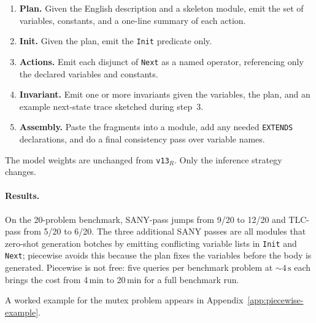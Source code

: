 \documentclass[11pt]{article}
\begin{document}
\begin{enumerate}[leftmargin=1.6em, itemsep=1pt]
\item \textbf{Plan.}  Given the English description and a skeleton
  module, emit the set of variables, constants, and a one-line
  summary of each action.
\item \textbf{Init.}  Given the plan, emit the \texttt{Init} predicate
  only.
\item \textbf{Actions.}  Emit each disjunct of \texttt{Next} as a
  named operator, referencing only the declared variables and
  constants.
\item \textbf{Invariant.}  Emit one or more invariants given the
  variables, the plan, and an example next-state trace
  sketched during step~3.
\item \textbf{Assembly.}  Paste the fragments into a module, add any
  needed \texttt{EXTENDS} declarations, and do a final
  consistency pass over variable names.
\end{enumerate}

The model weights are unchanged from \texttt{v13}$_R$.  Only the
inference strategy changes.

\paragraph{Results.}  On the 20-problem benchmark, SANY-pass jumps
from 9/20 to 12/20 and TLC-pass from 5/20 to 6/20.  The three
additional SANY passes are all modules that zero-shot generation
botches by emitting conflicting variable lists in \texttt{Init} and
\texttt{Next}; piecewise avoids this because the plan fixes the
variables before the body is generated.  Piecewise is not free:
five queries per benchmark problem at ${\sim}4\,\text{s}$ each brings
the cost from 4\,min to 20\,min for a full benchmark run.

A worked example for the mutex problem appears in
Appendix~\ref{app:piecewise-example}.
\end{document}
